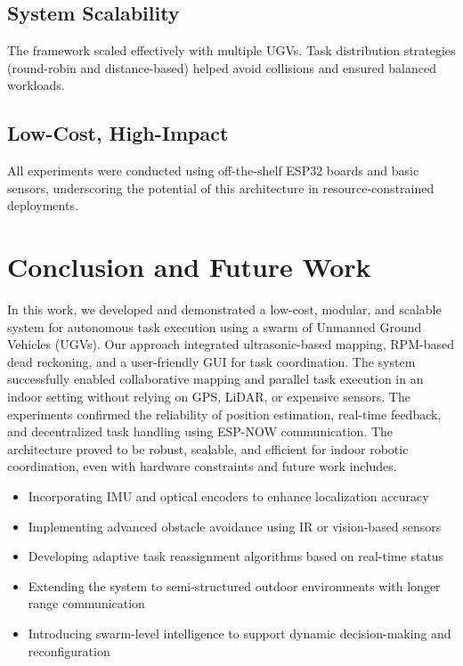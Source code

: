 \documentclass[conference]{IEEEtran}
\begin{document}
\subsection{System Scalability}
The framework scaled effectively with multiple UGVs. Task distribution strategies (round-robin and distance-based) helped avoid collisions and ensured balanced workloads.

\subsection{Low-Cost, High-Impact}
All experiments were conducted using off-the-shelf ESP32 boards and basic sensors, underscoring the potential of this architecture in resource-constrained deployments.

\section{Conclusion and Future Work}
\label{sec:conclusion}
In this work, we developed and demonstrated a low-cost, modular, and scalable system for autonomous task execution using a swarm of Unmanned Ground Vehicles (UGVs). Our approach integrated ultrasonic-based mapping, RPM-based dead reckoning, and a user-friendly GUI for task coordination. The system successfully enabled collaborative mapping and parallel task execution in an indoor setting without relying on GPS, LiDAR, or expensive sensors.
The experiments confirmed the reliability of position estimation, real-time feedback, and decentralized task handling using ESP-NOW communication. The architecture proved to be robust, scalable, and efficient for indoor robotic coordination, even with hardware constraints and future work includes.

\begin{itemize}
\item Incorporating IMU and optical encoders to enhance localization accuracy
\item Implementing advanced obstacle avoidance using IR or vision-based sensors
\item Developing adaptive task reassignment algorithms based on real-time status
\item Extending the system to semi-structured outdoor environments with longer range communication
\item Introducing swarm-level intelligence to support dynamic decision-making and reconfiguration
\end{itemize}



\end{document}
